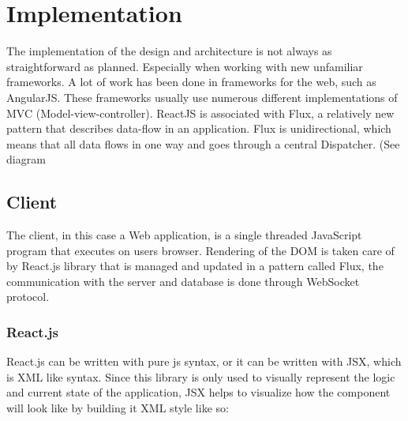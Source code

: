 \chapter{Implementation}
The implementation of the design and architecture is not always as straightforward as planned. Especially when working with new unfamiliar frameworks. A lot of work has been done in frameworks for the web, such as AngularJS. These frameworks usually use numerous different implementations of MVC (Model-view-controller). ReactJS is associated with Flux, a relatively new pattern that describes data-flow in an application. Flux is unidirectional, which means that all data flows in one way and goes through a central Dispatcher. (See diagram 
\section{Client}
The client, in this case a Web application, is a single threaded JavaScript program that executes on users browser. Rendering of the DOM is taken care of by React.js library that is managed and updated in a pattern called Flux, the communication with the server and database is done through WebSocket protocol.
\subsection{React.js}
React.js can be written with pure js syntax, or it can be written with JSX, which is XML like syntax. Since this library is only used to visually represent the logic and current state of the application, JSX helps to visualize how the component will look like by building it XML style like so:



